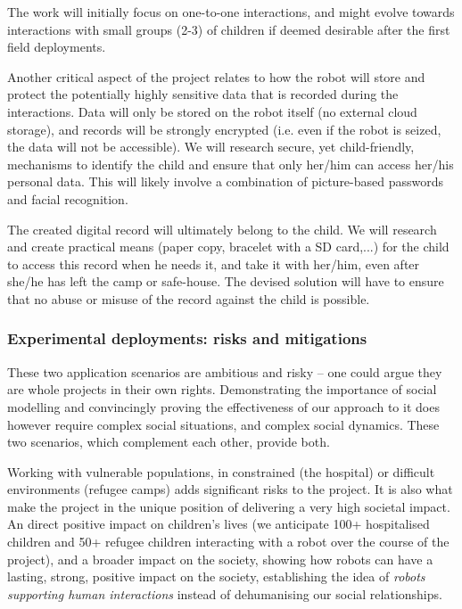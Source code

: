 \documentclass[11pt]{article}
\begin{document}
The work will initially focus on one-to-one interactions, and might evolve
towards interactions with small groups (2-3) of children if deemed desirable
after the first field deployments.

Another critical aspect of the project relates to how the robot will store and
protect the potentially highly sensitive data that is recorded during the
interactions. Data will only be stored on the robot itself (no external cloud
storage), and records will be strongly encrypted (i.e. even if the robot is
seized, the data will not be accessible). We will research secure, yet
child-friendly, mechanisms to identify the child and ensure that only her/him
can access her/his personal data. This will likely involve a combination of
picture-based passwords and facial recognition.

The created digital record will ultimately belong to the child. We will research
and create practical means (paper copy, bracelet with a SD card,...) for the
child to access this record when he needs it, and take it with her/him, even
after she/he has left the camp or safe-house. The devised solution will have to
ensure that no abuse or misuse of the record against the child is possible.

\subsubsection{Experimental deployments: risks and mitigations}

These two application scenarios are ambitious and risky -- one could argue they
are whole projects in their own rights. Demonstrating the importance of social
modelling and convincingly proving the effectiveness of our approach to it does
however require complex social situations, and complex social dynamics. These
two scenarios, which complement each other, provide both.

Working with vulnerable populations, in constrained (the hospital) or difficult
environments (refugee camps) adds significant risks to the project. It is also
what make the project in the unique position of delivering a very high societal
impact. An direct positive impact on children's lives (we anticipate 100+
hospitalised children and 50+ refugee children interacting with a robot over the
course of the project), and a broader impact on the society, showing how robots
can have a lasting, strong, positive impact on the society, establishing the
idea of \emph{robots supporting human interactions} instead of dehumanising our
social relationships.
\end{document}
